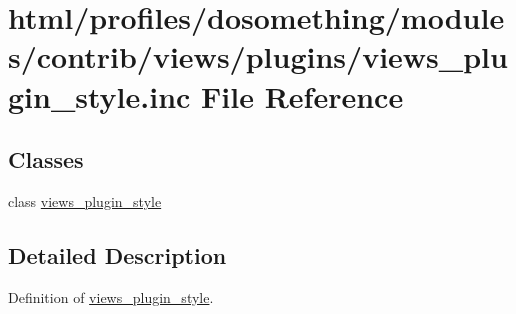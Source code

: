 \hypertarget{views__plugin__style_8inc}{
\section{html/profiles/dosomething/modules/contrib/views/plugins/views\_\-plugin\_\-style.inc File Reference}
\label{views__plugin__style_8inc}
}
\subsection*{Classes}
\begin{DoxyCompactItemize}
\item 
class \hyperlink{classviews__plugin__style}{views\_\-plugin\_\-style}
\end{DoxyCompactItemize}


\subsection{Detailed Description}
Definition of \hyperlink{classviews__plugin__style}{views\_\-plugin\_\-style}. 